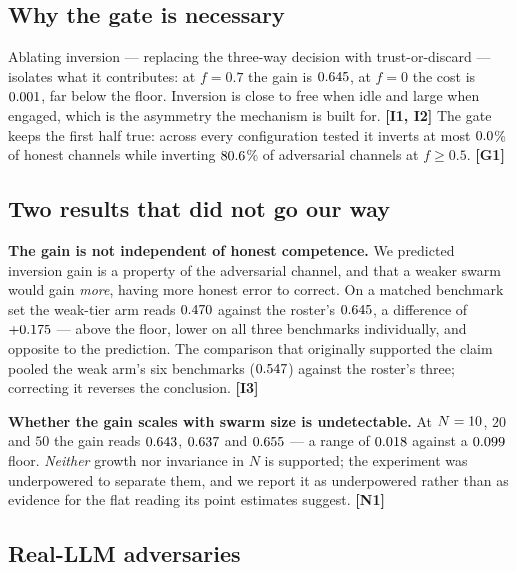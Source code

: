 \subsection{Why the gate is necessary}

Ablating inversion --- replacing the three-way decision with trust-or-discard ---
isolates what it contributes: at $f=0.7$ the gain is $0.645$,
at $f=0$ the cost is $0.001$, far below the floor. Inversion is
close to free when idle and large when engaged, which is the asymmetry the
mechanism is built for. \textbf{[I1, I2]} The gate keeps the first half true:
across every configuration tested it inverts at most $0.0$\% of
honest channels while inverting $80.6$\% of adversarial
channels at $f \geq 0.5$. \textbf{[G1]}


\subsection{Two results that did not go our way}

\textbf{The gain is not independent of honest competence.} We predicted inversion
gain is a property of the adversarial channel, and that a weaker swarm would gain
\emph{more}, having more honest error to correct. On a matched benchmark set the
weak-tier arm reads $0.470$ against the roster's
$0.645$, a difference of $+0.175$ ---
above the floor, lower on all three benchmarks individually, and opposite to the
prediction. The comparison that originally supported the claim pooled the weak
arm's six benchmarks ($0.547$) against the roster's
three; correcting it reverses the conclusion. \textbf{[I3]}

\textbf{Whether the gain scales with swarm size is undetectable.} At
$N=10$, $20$ and $50$ the gain reads $0.643$,
$0.637$ and $0.655$ --- a range of
$0.018$ against a $0.099$ floor. \emph{Neither} growth
nor invariance in $N$ is supported; the experiment was underpowered to separate
them, and we report it as underpowered rather than as evidence for the flat
reading its point estimates suggest. \textbf{[N1]}

\subsection{Real-LLM adversaries}

